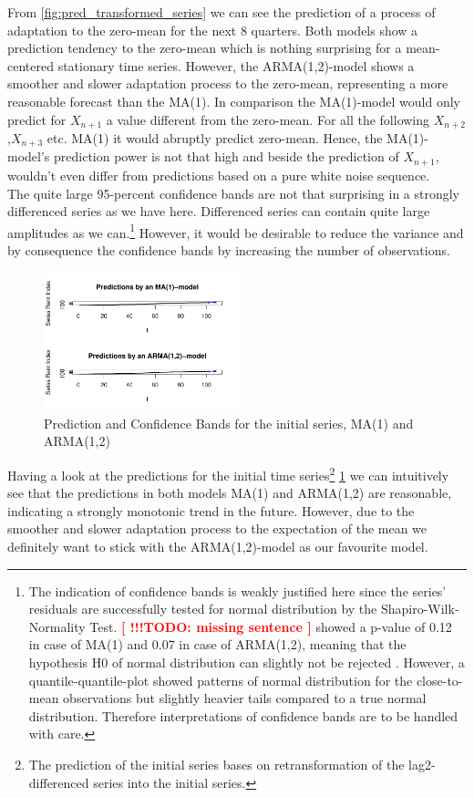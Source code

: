 \documentclass[11pt,a4paper]{article}
\newcommand{\TODO}[1]{%
    \textcolor{red}{ %
        \textbf{[ !!!TODO: #1 ]}%
    }%
    \PackageWarning{TODO:}{TODO: #1}%
}
\begin{document}
From \cref{fig:pred_transformed_series} we can see the prediction of a process of adaptation to the zero-mean for the next 8 quarters.
Both models show a prediction tendency to the zero-mean which is nothing surprising for a mean-centered stationary time series. However, the ARMA(1,2)-model shows a smoother and slower adaptation process to the zero-mean, representing a more reasonable forecast than the MA(1). In comparison the MA(1)-model would only predict for $X_{n+1}$ a value different from the zero-mean. For all the following $X_{n+2}$,$X_{n+3}$ etc. MA(1) it would abruptly predict zero-mean. Hence, the MA(1)-model's prediction power is not that high and beside the prediction of $X_{n+1}$, wouldn't even differ from predictions based on a pure white noise sequence.  \\
The quite large 95-percent confidence bands are not that surprising in a strongly differenced series as we have here. Differenced series  can contain quite large amplitudes as we can.\footnote{
    The indication of confidence bands is weakly justified here since the series’ residuals are successfully tested for normal distribution by the Shapiro-Wilk-Normality Test. \TODO{missing sentence} showed a p-value of 0.12 in case of MA(1) and 0.07 in case of ARMA(1,2), meaning that the hypothesis H0 of normal distribution can slightly not be rejected \citep{shapiro}.
    However, a quantile-quantile-plot showed patterns of normal distribution for the close-to-mean observations but slightly heavier tails compared to a true normal distribution.
    Therefore interpretations of confidence bands are to be handled with care.
}
However, it would be desirable to reduce the variance and by consequence the confidence bands by increasing the number of observations. \\
\begin{figure}
    \centering
    \includegraphics[width=0.5\textwidth]{pred_initial_series}
    \caption{Prediction and Confidence Bands for the initial series, MA(1) and ARMA(1,2)}
    \label{fig:pred_initial_series}
\end{figure}
Having a look at the predictions for the initial time series\footnote{The prediction of the initial series bases on retransformation of the lag2-differenced series into the initial series.} \cref{fig:pred_initial_series} we can intuitively see that the predictions in both models MA(1) and ARMA(1,2) are reasonable, indicating a strongly monotonic trend in the future. However, due to the smoother and slower adaptation process to the expectation of the mean we definitely want to stick with the ARMA(1,2)-model as our favourite model.
\end{document}

